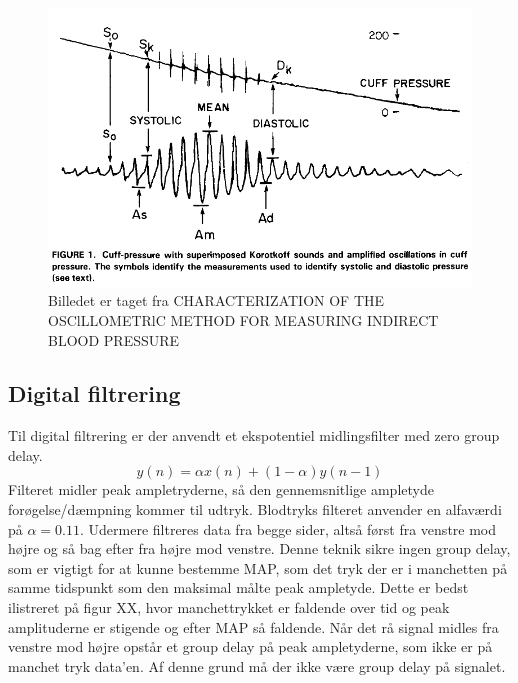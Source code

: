 \begin{figure}[H]
	\includegraphics[width=\textwidth]{billeder/OptimalBlodtryksmaling.png}
	\caption{Billedet er taget fra CHARACTERIZATION 	 OF THE OSClLLOMETRlC METHOD FOR MEASURING INDIRECT BLOOD 	PRESSURE}\label{fig:goodMeasurement}
\end{figure}

\subsection{Digital filtrering}
Til digital filtrering er der anvendt et ekspotentiel midlingsfilter med zero group delay.
\begin{equation}
	y(n) = \alpha x(n)+(1-\alpha )y(n-1)
\end{equation}
Filteret midler peak ampletryderne, så den gennemsnitlige ampletyde forøgelse/dæmpning kommer til udtryk. Blodtryks filteret anvender en alfaværdi på $\alpha = 0.11$. Udermere filtreres data fra begge sider, altså først fra venstre mod højre og så bag efter fra højre mod venstre. Denne teknik sikre ingen group delay, som er vigtigt for at kunne bestemme MAP, som det tryk der er i manchetten på samme tidspunkt som den maksimal målte peak ampletyde. Dette er bedst ilistreret på figur XX, hvor manchettrykket er faldende over tid og peak amplituderne er stigende og efter MAP så faldende. Når det rå signal midles fra venstre mod højre opstår et group delay på peak ampletyderne, som ikke er på manchet tryk data'en. Af denne grund må der ikke være group delay på signalet.

